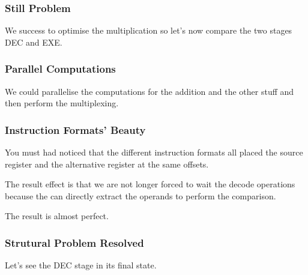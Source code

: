 
\begin{frame}
  \frametitle{Still Problem}

  We success to optimise the multiplication so let's now compare the
  two stages DEC and EXE.

  \begin{center}
  \end{center}
\end{frame}


\begin{frame}
  \frametitle{Parallel Computations}

  We could parallelise the computations for the addition and the
  other stuff and then perform the multiplexing.

  \begin{center}
  \end{center}
\end{frame}


\begin{frame}
  \frametitle{Instruction Formats' Beauty}

  You must had noticed that the different instruction formats all placed
  the source register and the alternative register at the same offsets.

  \nl

  The result effect is that we are not longer forced to wait the decode
  operations because the can directly extract the operands to perform
  the comparison.

  \begin{center}
  \end{center}

  The result is almost perfect.
\end{frame}


\begin{frame}
  \frametitle{Strutural Problem Resolved}

  Let's see the DEC stage in its final state.

  \begin{center}
  \end{center}
\end{frame}


